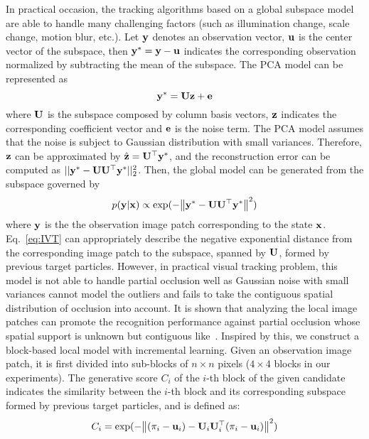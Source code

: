 \documentclass[preprint,12pt,review]{elsarticle}
\begin{document}
In practical occasion, the tracking algorithms based on a global subspace model are able to handle many challenging factors (such as illumination change, scale change, motion blur, etc.).
Let $\bf{y}$ denotes an observation vector, $\bf{u}$ is the center vector of the subspace, then ${{\bf{y}}^*} = {\bf{y}} - {\bf{u}}$ indicates the corresponding observation normalized by subtracting the mean of the subspace.
The PCA model can be represented as
\begin{equation}{\bf{y}^*} = {\bf{Uz}} + {\bf{e}}
\end{equation}
where $\bf{U}$ is the subspace composed by column basis vectors, $\bf{z}$ indicates the corresponding coefficient vector and $\bf{e}$ is the noise term.
The PCA model assumes that the noise is subject to Gaussian distribution with small variances.
Therefore, $\bf{z}$ can be approximated by $\hat{\bf{z}}  = {{\bf{U}}^ \top }{{\bf{y}}^*}$, and the reconstruction error can be computed as $||{{\bf{y}}^*} - {\bf{U}}{{\bf{U}}^ \top }{{\bf{y}}^*}||_2^2$.
Then, the global model can be generated from the subspace governed by
\begin{equation}
p({{\bf{y}}}|{{\bf{x}}}) \propto \exp ( - {\left\| {{{\bf{y}}^*} - {\bf{U}}{{\bf{U}}^ \top }{{\bf{y}}^*}} \right\|^2})
\label{eq:IVT}
\end{equation}
where ${{\bf{y}}}$ is the the observation image patch corresponding to the state ${{\bf{x}}}$.
Eq.~\ref{eq:IVT} can appropriately describe the negative exponential distance from the corresponding image patch to the subspace, spanned by $\bf{U}$, formed by previous target particles.
However, in practical visual tracking problem, this model is not able to handle partial occlusion well as Gaussian noise with small variances cannot model the outliers and fails to take the contiguous spatial distribution of occlusion into account.
It is shown that analyzing the local image patches can promote the recognition performance against partial occlusion whose spatial support is unknown but contiguous like~\cite{martinez2002recognizing, ahonen2006face}.
Inspired by this, we construct a block-based local model with incremental learning.
Given an observation image patch, it is first divided into sub-blocks of $n \times n$ pixels ($4 \times 4$ blocks in our experiments).
The generative score ${{C_{i}}} $ of the $i$-th block of the given candidate indicates the similarity between the $i$-th block and its corresponding subspace formed by previous target particles, and is defined as:
\begin{equation}{C_i} = \exp ( - {\left\| {({\mathbf{\pi}_i} - {{\bf{u}}_i}) - {{\bf{U}}_i}{\bf{U}}_i^ \top ({\bf{\pi}}_i - {{
\bf{u}}_i})} \right\|^2})
\end{equation}
\end{document}
